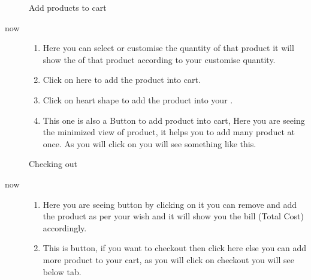 \documentclass[a4paper,10pt,english]{report}
\begin{document}
\begin{figure}[htbp]
\centering
\capstart

\noindent{}
\caption{Add products to cart}\label{\detokenize{index:id13}}\label{\detokenize{index:id3}}\end{figure}
\begin{description}
\item[{now}] \leavevmode\begin{enumerate}
\def\theenumi{\alph{enumi}}
\def\labelenumi{\theenumi .}
\makeatletter\def\p@enumii{\p@enumi \theenumi .}\makeatother
\item {} 
Here you can select or customise the quantity of that product it will show the  of that product according to your customise quantity.

\item {} 
Click on  here to add the product into cart.

\item {} 
Click on heart shape to add the product into your .

\item {} 
This one is also a  Button to add product into cart, Here you are seeing the minimized view of product, it helps you to add many product at once. As you will click on  you will see something like this.

\end{enumerate}

\end{description}

\begin{figure}[htbp]
\centering
\capstart

\noindent{}
\caption{Checking out}\label{\detokenize{index:id14}}\label{\detokenize{index:id4}}\end{figure}
\begin{description}
\item[{now}] \leavevmode\begin{enumerate}
\def\theenumi{\alph{enumi}}
\def\labelenumi{\theenumi .}
\makeatletter\def\p@enumii{\p@enumi \theenumi .}\makeatother
\item {} 
Here you are seeing \sphinxstylestrong{- \& +} button by clicking on it you can remove and add the product as per your  wish and it will show you the bill (Total Cost) accordingly.

\item {} 
This is  button, if you want to checkout then click here else you can add more product to your cart, as you will click on checkout you will see below tab.

\end{enumerate}

\end{description}
\end{document}
